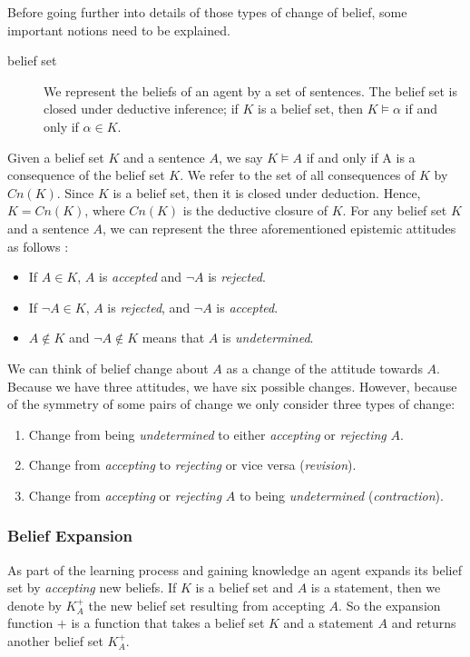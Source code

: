 Before going further into details of those types of change of belief, some important notions need to be explained.

\begin{description}
\item[belief set]

We represent the beliefs of an agent by a set of sentences. The belief set is closed under deductive inference; if $K$ is a belief set, then $K \models \alpha$ if and only if $\alpha \in K$.
\end{description}

Given a belief set $K$ and a sentence $A$, we say $K \models A$ if and only if A is a consequence of the belief set $K$. We refer to the set of all consequences of $K$ by $Cn(K)$. Since $K$ is a belief set, then it is closed under deduction. Hence, $K = Cn(K)$, where $Cn(K)$ is the deductive closure of $K$. For any belief set $K$ and a sentence $A$, we can represent the three aforementioned epistemic attitudes as follows \cite{flux}:

\begin{itemize}
\item If $A \in K$, $A$ is \textit{accepted} and $\neg A$ is \textit{rejected}.

\item If $\neg A \in K$, $A$ is \textit{rejected}, and $\neg A$ is \textit{accepted}.

\item $A \notin K$ and $\neg A \notin K$ means that $A$ is \textit{undetermined}.
\end{itemize}

We can think of belief change about $A$ as a change of the attitude towards $A$. Because we have three attitudes, we have six possible changes. However, because of the symmetry of some pairs of change we only consider three types of change:

\begin{enumerate}
\item Change from being \textit{undetermined} to either \textit{accepting} or \textit{rejecting} $A$.
\item Change from \textit{accepting} to \textit{rejecting} or vice versa (\textit{revision}).
\item Change from \textit{accepting} or \textit{rejecting} $A$ to being \textit{undetermined} (\textit{contraction})\cite{flux}.
\end{enumerate}

\subsubsection{Belief Expansion}
As part of the learning process and gaining knowledge an agent expands its belief set by \textit{accepting} new beliefs. If $K$ is a belief set and $A$ is a statement, then we denote by $K^{+}_{A}$ the new belief set resulting from accepting $A$. So the expansion function $+$ is a function that takes a belief set $K$ and a statement $A$ and returns another belief set $K^{+}_{A}$. 

